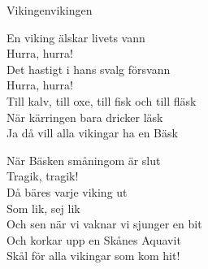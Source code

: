 \begin{song}{Vikingen}{vikingen}
\begin{vers}
En viking älskar livets vann\\
Hurra, hurra!\\
Det hastigt i hans svalg försvann\\
Hurra, hurra!\\
Till kalv, till oxe, till fisk och till fläsk\\
När kärringen bara dricker läsk\\
Ja då vill alla vikingar ha en Bäsk\\
\end{vers}
\begin{vers}
När Bäsken småningom är slut\\
Tragik, tragik!\\
Då bäres varje viking ut\\
Som lik, sej lik\\
Och sen när vi vaknar vi sjunger en bit\\
Och korkar upp en Skånes Aquavit\\
\repopen Skål för alla vikingar som kom hit! \repclose\\
\end{vers}
\end{song}
